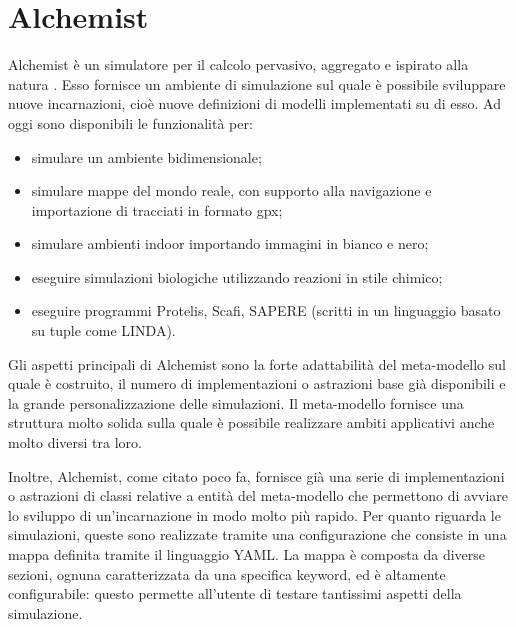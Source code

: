 \section{Alchemist}
Alchemist è un simulatore per il calcolo pervasivo, aggregato e ispirato alla natura \cite{Alchemist}. Esso fornisce un ambiente di simulazione sul quale è possibile sviluppare nuove incarnazioni, cioè nuove definizioni di modelli implementati su di esso. Ad oggi sono disponibili le funzionalità per:
\begin{itemize}
\item simulare un ambiente bidimensionale;
\item simulare mappe del mondo reale, con supporto alla navigazione e importazione di tracciati in formato gpx;
\item simulare ambienti indoor importando immagini in bianco e nero;
\item eseguire simulazioni biologiche utilizzando reazioni in stile chimico;
\item eseguire programmi Protelis, Scafi, SAPERE (scritti in un linguaggio basato su tuple come LINDA).
\end{itemize}

Gli aspetti principali di Alchemist sono la forte adattabilità del meta-modello sul quale è costruito, il numero di implementazioni o astrazioni base già disponibili e la grande personalizzazione delle simulazioni.
Il meta-modello fornisce una struttura molto solida sulla quale è possibile realizzare ambiti applicativi anche molto diversi tra loro.

Inoltre, Alchemist, come citato poco fa, fornisce già una serie di implementazioni o astrazioni di classi relative a entità del meta-modello che permettono di avviare lo sviluppo di un'incarnazione in modo molto più rapido.
Per quanto riguarda le simulazioni, queste sono realizzate tramite una configurazione che consiste in una mappa definita tramite il linguaggio YAML. La mappa è composta da diverse sezioni, ognuna caratterizzata da una specifica keyword, ed è altamente configurabile: questo permette all'utente di testare tantissimi aspetti della simulazione.

